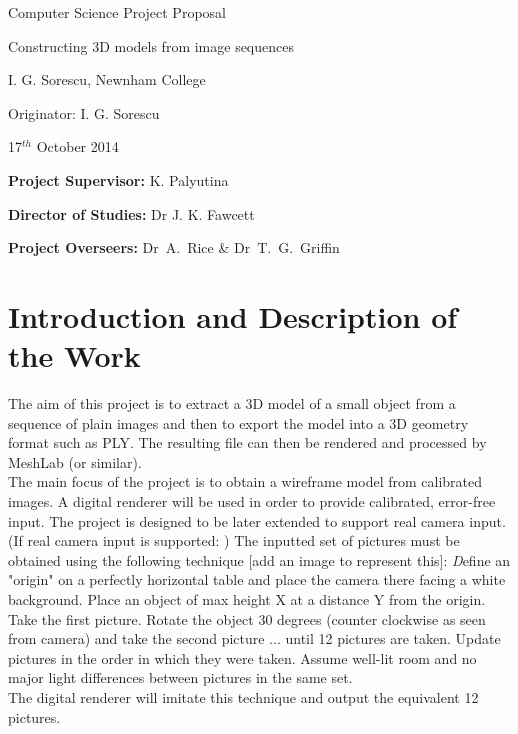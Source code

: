 

\vfil

\centerline{\Large Computer Science Project Proposal}
\vspace{0.4in}
\centerline{\Large Constructing 3D models from image sequences}
\vspace{0.4in}
\centerline{\large I. G. Sorescu, Newnham College}
\vspace{0.3in}
\centerline{\large Originator: I. G. Sorescu}
\vspace{0.3in}
\centerline{\large 17$^{th}$ October 2014}

\vfil


\noindent
{\bf Project Supervisor:} K. Palyutina
\vspace{0.2in}

\noindent
{\bf Director of Studies:} Dr J. K. Fawcett
\vspace{0.2in}
\noindent
 
\noindent
{\bf Project Overseers:} Dr~A.~Rice  \& Dr~T.~G.~Griffin



\section*{Introduction and Description of the Work}

The aim of this project is to extract a 3D model of a small object from a sequence of plain images and then to export the model into a 3D geometry format such as PLY. The resulting file can then be rendered and processed by MeshLab (or similar).  \\
The main focus of the project is to obtain a wireframe model from calibrated images. A digital renderer will be used in order to provide calibrated, error-free input. The project is designed to be later extended to support real camera input.\\
(If real camera input is supported: ) The inputted set of pictures must be obtained using the following technique [add an image to represent this]: 
{\emph Define an "origin" on a perfectly horizontal table and place the camera there facing a white background. Place an object of max height X at a distance Y from the origin. Take the first picture. Rotate the object 30 degrees (counter clockwise as seen from camera) and take the second picture ... until 12 pictures are taken. Update pictures in the order in which they were taken. Assume well-lit room and no major light differences between pictures in the same set.}\\  The digital renderer will imitate this technique and output the equivalent 12 pictures.

